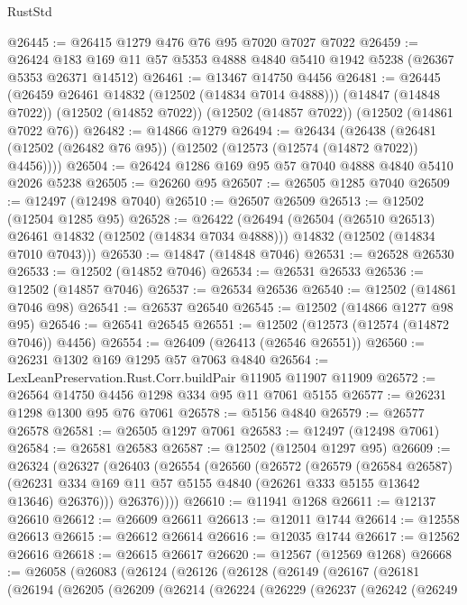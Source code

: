 \begin{lexlean}{RustStd}
\begin{coremodule}
@26445 := @26415 @1279 @476 @76 @95 @7020 @7027 @7022
@26459 := @26424 @183 @169 @11 @57 @5353 @4888 @4840 @5410 @1942 @5238 (@26367 @5353 @26371 @14512)
@26461 := @13467 @14750 @4456
@26481 := @26445
    (@26459 @26461 @14832 (@12502 (@14834 @7014 @4888)))
    (@14847 (@14848 @7022))
    (@12502 (@14852 @7022))
    (@12502 (@14857 @7022))
    (@12502 (@14861 @7022 @76))
@26482 := @14866 @1279
@26494 := @26434
    (@26438 (@26481 (@12502 (@26482 @76 @95)) (@12502 (@12573 (@12574 (@14872 @7022)) @4456))))
@26504 := @26424 @1286 @169 @95 @57 @7040 @4888 @4840 @5410 @2026 @5238
@26505 := @26260 @95
@26507 := @26505 @1285 @7040
@26509 := @12497 (@12498 @7040)
@26510 := @26507 @26509
@26513 := @12502 (@12504 @1285 @95)
@26528 := @26422
    (@26494
      (@26504 (@26510 @26513) @26461 @14832 (@12502 (@14834 @7034 @4888)))
      @14832
      (@12502 (@14834 @7010 @7043)))
@26530 := @14847 (@14848 @7046)
@26531 := @26528 @26530
@26533 := @12502 (@14852 @7046)
@26534 := @26531 @26533
@26536 := @12502 (@14857 @7046)
@26537 := @26534 @26536
@26540 := @12502 (@14861 @7046 @98)
@26541 := @26537 @26540
@26545 := @12502 (@14866 @1277 @98 @95)
@26546 := @26541 @26545
@26551 := @12502 (@12573 (@12574 (@14872 @7046)) @4456)
@26554 := @26409 (@26413 (@26546 @26551))
@26560 := @26231 @1302 @169 @1295 @57 @7063 @4840
@26564 := LexLeanPreservation.Rust.Corr.buildPair @11905 @11907 @11909
@26572 := @26564 @14750 @4456 @1298 @334 @95 @11 @7061 @5155
@26577 := @26231 @1298 @1300 @95 @76 @7061
@26578 := @5156 @4840
@26579 := @26577 @26578
@26581 := @26505 @1297 @7061
@26583 := @12497 (@12498 @7061)
@26584 := @26581 @26583
@26587 := @12502 (@12504 @1297 @95)
@26609 := @26324
    (@26327
      (@26403
        (@26554
          (@26560
            (@26572
              (@26579
                (@26584 @26587)
                (@26231 @334 @169 @11 @57 @5155 @4840 (@26261 @333 @5155 @13642 @13646) @26376)))
            @26376))))
@26610 := @11941 @1268
@26611 := @12137 @26610
@26612 := @26609 @26611
@26613 := @12011 @1744
@26614 := @12558 @26613
@26615 := @26612 @26614
@26616 := @12035 @1744
@26617 := @12562 @26616
@26618 := @26615 @26617
@26620 := @12567 (@12569 @1268)
@26668 := @26058
    (@26083
      (@26124
        (@26126
          (@26128
            (@26149
              (@26167
                (@26181
                  (@26194
                    (@26205
                      (@26209
                        (@26214
                          (@26224
                            (@26229
                              (@26237
                                (@26242
                                  (@26249

\end{coremodule}
\end{lexlean}
